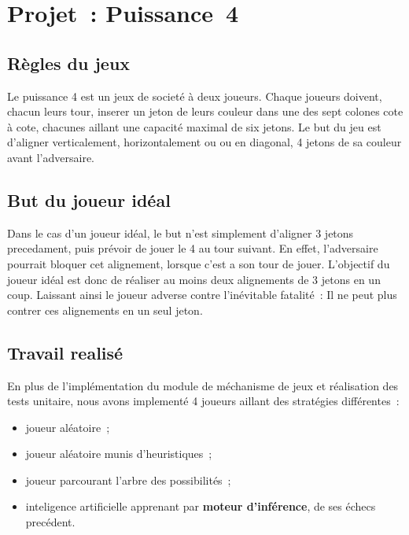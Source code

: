 \chapter{Projet~: Puissance~4}

\section{Règles du jeux}

Le puissance 4 est un jeux de societé à deux joueurs. Chaque joueurs doivent,
chacun leurs tour, inserer un jeton de leurs couleur dans une des sept
colones cote à cote, chacunes aillant une capacité maximal de
six jetons. Le but du jeu est d'aligner verticalement, horizontalement ou
ou en diagonal, 4 jetons de sa couleur avant l'adversaire.


\section{But du joueur idéal}

Dans le cas d'un joueur idéal, le but n'est simplement d'aligner 3 jetons precedament,
puis prévoir de jouer le 4 au tour suivant. En effet, l'adversaire pourrait bloquer cet alignement,
lorsque c'est a son tour de jouer. L'objectif du joueur idéal est donc de réaliser
au moins deux alignements de 3 jetons en un coup. Laissant ainsi le joueur adverse
contre l'inévitable fatalité~: Il ne peut plus contrer ces alignements en un seul jeton.


\section{Travail realisé}

En plus de l'implémentation du module de méchanisme de jeux et réalisation des
tests unitaire, nous avons implementé 4 joueurs aillant des stratégies différentes~:

\begin{itemize}

    \item joueur aléatoire~;
    \item joueur aléatoire munis d'heuristiques~;
    \item joueur parcourant l'arbre des possibilités~;
    \item inteligence artificielle apprenant par \textbf{moteur d'inférence}, de ses
    échecs precédent.

\end{itemize}

